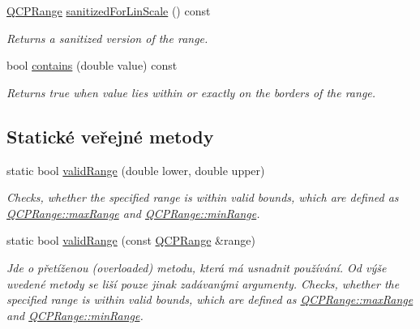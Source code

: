 \begin{DoxyCompactItemize}
\hyperlink{classQCPRange}{Q\+C\+P\+Range} \hyperlink{classQCPRange_a1ff029704c29a75adbc1dc36cecaf44c}{sanitized\+For\+Lin\+Scale} () const 
\begin{DoxyCompactList}\small\item\em Returns a sanitized version of the range. \end{DoxyCompactList}\item 
\hypertarget{classQCPRange_a030ce95b527c32e01414d0351347b46d}{}bool \hyperlink{classQCPRange_a030ce95b527c32e01414d0351347b46d}{contains} (double value) const \label{classQCPRange_a030ce95b527c32e01414d0351347b46d}

\begin{DoxyCompactList}\small\item\em Returns true when {\itshape value} lies within or exactly on the borders of the range. \end{DoxyCompactList}\end{DoxyCompactItemize}
\subsection*{Statické veřejné metody}
\begin{DoxyCompactItemize}
\item 
static bool \hyperlink{classQCPRange_ab38bd4841c77c7bb86c9eea0f142dcc0}{valid\+Range} (double lower, double upper)
\begin{DoxyCompactList}\small\item\em Checks, whether the specified range is within valid bounds, which are defined as \hyperlink{classQCPRange_a5ca51e7a2dc5dc0d49527ab171fe1f4f}{Q\+C\+P\+Range\+::max\+Range} and \hyperlink{classQCPRange_ab46d3bc95030ee25efda41b89e2b616b}{Q\+C\+P\+Range\+::min\+Range}. \end{DoxyCompactList}\item 
static bool \hyperlink{classQCPRange_a801b964752eaad6219be9d8a651ec2b3}{valid\+Range} (const \hyperlink{classQCPRange}{Q\+C\+P\+Range} \&range)
\begin{DoxyCompactList}\small\item\em Jde o přetíženou (overloaded) metodu, která má usnadnit používání. Od výše uvedené metody se liší pouze jinak zadávanými argumenty. Checks, whether the specified range is within valid bounds, which are defined as \hyperlink{classQCPRange_a5ca51e7a2dc5dc0d49527ab171fe1f4f}{Q\+C\+P\+Range\+::max\+Range} and \hyperlink{classQCPRange_ab46d3bc95030ee25efda41b89e2b616b}{Q\+C\+P\+Range\+::min\+Range}. \end{DoxyCompactList}\end{DoxyCompactItemize}

